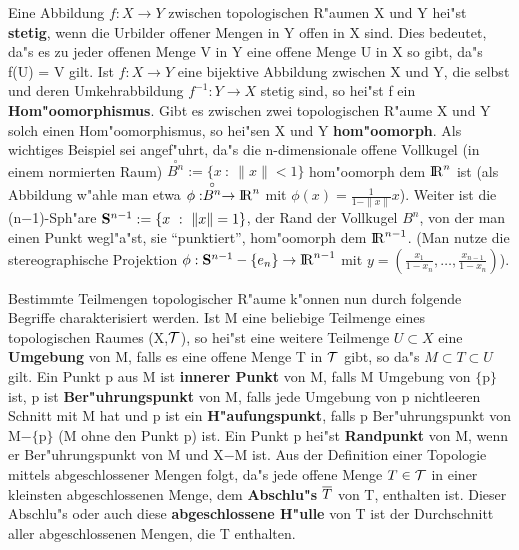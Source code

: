 Eine Abbildung $f:X\to Y$ zwischen topologischen R"aumen X und Y hei"st
{\bf stetig}, wenn die Urbilder offener Mengen in Y offen in X sind.
Dies bedeutet, da"s es zu jeder offenen Menge V in Y eine offene Menge U in X
so gibt, da"s f(U) = V gilt.
Ist $f:X\to Y$ eine bijektive Abbildung zwischen X und Y, die selbst
und deren Umkehrabbildung $f^{-1}:Y\to X$ stetig sind, so hei"st f ein
{\bf Hom"oomorphismus}. Gibt es zwischen zwei
topologischen R"aume X und Y solch einen Hom"oomorphismus, so hei"sen X und Y
{\bf hom"oomorph}.
Als wichtiges Beispiel sei angef"uhrt, da"s die n-dimensionale offene Vollkugel
(in einem normierten Raum) $\stackrel{\circ}{B^n} := \{x~:~\|x\|< 1\}$
hom"oomorph dem $\R^n$ ist (als Abbildung w"ahle man etwa
$\phi:\stackrel{\circ}{B^n}\to\R^n$ mit $\phi(x)=\frac{1}{1-\|x\|}x$). Weiter
ist die (n$-$1)-Sph"are $\S^{n-1}:=\{x~:~\|x\|=1\}$, der Rand der Vollkugel
$B^n$, von der man einen Punkt wegl"a"st, sie "`punktiert"', hom"oomorph dem
$\R^{n-1}$. (Man nutze die stereographische Projektion
$\phi:\S^{n-1}-\{e_n\}\to\R^{n-1}$ mit
$y=(\frac{x_1}{1-x_n},\ldots,\frac{x_{n-1}}{1-x_n})$).

Bestimmte Teilmengen topologischer R"aume k"onnen nun durch folgende Begriffe
charakterisiert werden. Ist M eine beliebige Teilmenge eines
topologischen Raumes (X,$\T$), so hei"st eine weitere Teilmenge $U\subset X$
eine {\bf Umgebung} von M, falls es eine offene Menge T in $\T$
gibt, so da"s $M\subset T\subset U$ gilt.
Ein Punkt p aus M ist {\bf innerer Punkt} von M, falls M
Umgebung von  $\{$p$\}$ ist, p ist {\bf Ber"uhrungspunkt}
von M, falls jede Umgebung von p nichtleeren Schnitt mit M hat und p ist ein
{\bf H"aufungspunkt}, falls p Ber"uhrungspunkt von
M$-\{$p$\}$ (M ohne den Punkt p) ist. Ein Punkt p hei"st {\bf Randpunkt}
 von M, wenn er Ber"uhrungspunkt von M und X$-$M ist.
Aus der Definition einer Topologie mittels abgeschlossener Mengen
folgt, da"s jede offene Menge $T\in\T$ in einer kleinsten abgeschlossenen
Menge, dem {\bf Abschlu"s} $\ol{T}$ von T, enthalten ist. Dieser
Abschlu"s oder auch diese {\bf abgeschlossene H"ulle} von T ist der Durchschnitt
aller abgeschlossenen Mengen, die T enthalten.

